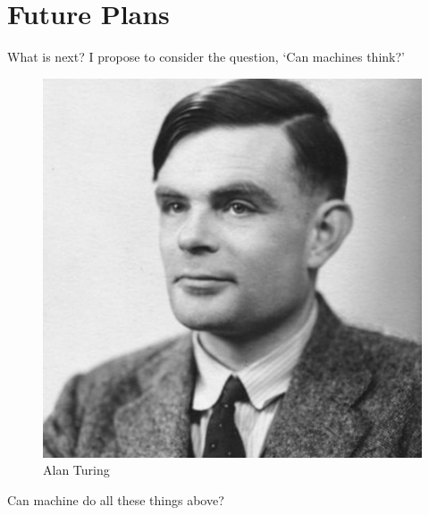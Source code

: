 \documentclass{beamer}
\begin{document}
\section{Future Plans}
\begin{frame}{What is next?}
\centering
I propose to consider the question, `Can machines think?'
	\begin{figure}
		\includegraphics[width=.5\linewidth]{Pics/aturing.jpg}
		\caption{Alan Turing}
	\end{figure}
Can machine do all these things above? 
\end{frame}
\end{document}

